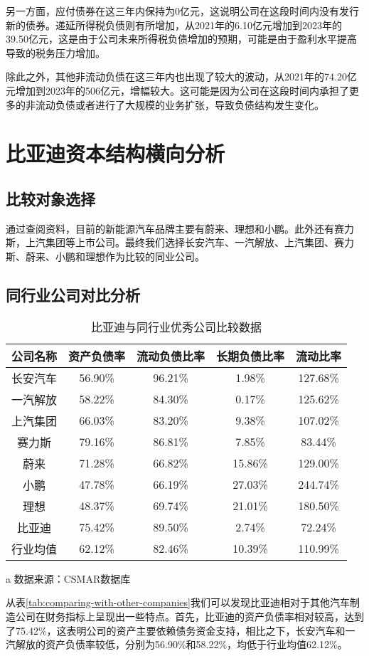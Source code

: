 另一方面，应付债券在这三年内保持为0亿元，这说明公司在这段时间内没有发行新的债券。递延所得税负债则有所增加，从2021年的6.10亿元增加到2023年的39.50亿元，这是由于公司未来所得税负债增加的预期，可能是由于盈利水平提高导致的税务压力增加。

除此之外，其他非流动负债在这三年内也出现了较大的波动，从2021年的74.20亿元增加到2023年的506亿元，增幅较大。这可能是因为公司在这段时间内承担了更多的非流动负债或者进行了大规模的业务扩张，导致负债结构发生变化。

\section{比亚迪资本结构横向分析}
\subsection{比较对象选择}
通过查阅资料，目前的新能源汽车品牌主要有蔚来、理想和小鹏。此外还有赛力斯，上汽集团等上市公司。最终我们选择长安汽车、一汽解放、上汽集团、赛力斯、蔚来、小鹏和理想作为比较的同业公司。
\subsection{同行业公司对比分析}
\begin{table}
  \centering
  \begin{threeparttable}[c]
    \caption{比亚迪与同行业优秀公司比较数据}
    \label{tab:comparing-with-other-companies}
    \begin{tabular}{ccccc}
      \toprule
        公司名称 & 资产负债率 & 流动负债比率 & 长期负债比率 & 流动比率  \\
      \midrule
        长安汽车 & 56.90\% & 96.21\% & 1.98\% & 127.68\% \\
        一汽解放 & 58.22\% & 84.30\% & 0.17\% & 125.62\% \\
        上汽集团 & 66.03\% & 83.20\% & 9.38\% & 107.02\% \\
        赛力斯 & 79.16\% & 86.81\% & 7.85\% & 83.44\% \\
        蔚来 & 71.28\% & 66.82\% & 15.86\% & 129.00\% \\
        小鹏 & 47.78\% & 66.19\% & 27.03\% & 244.74\% \\
        理想 & 48.37\% & 69.74\% & 21.01\% & 180.50\% \\
        比亚迪 & 75.42\% & 89.50\% & 2.74\% & 72.24\% \\
        行业均值 & 62.12\% & 82.46\% & 10.39\% & 110.99\% \\
      \bottomrule
    \end{tabular}
    \begin{tablenotes}
      \item [a] 数据来源：CSMAR数据库
    \end{tablenotes}
  \end{threeparttable}
\end{table}
从表\eqref{tab:comparing-with-other-companies}我们可以发现比亚迪相对于其他汽车制造公司在财务指标上呈现出一些特点。首先，比亚迪的资产负债率相对较高，达到了75.42\%，这表明公司的资产主要依赖债务资金支持，相比之下，长安汽车和一汽解放的资产负债率较低，分别为56.90\%和58.22\%，均低于行业均值62.12\%。

